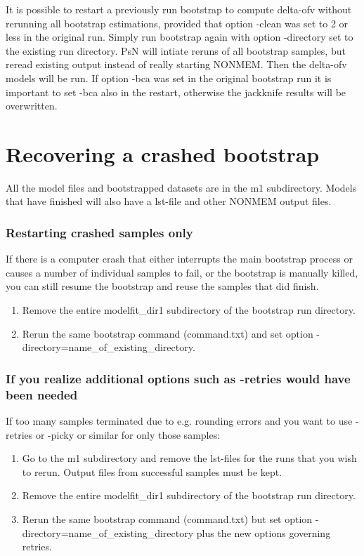 It is possible to restart a previously run bootstrap to compute delta-ofv without rerunning all bootstrap estimations, provided that option -clean was set to 2 or less in the original run. Simply run bootstrap again with option -directory set to the existing run directory. PsN will intiate reruns of all bootstrap samples, but reread existing output instead of really starting NONMEM. Then the delta-ofv models will be run. If option -bca was set in the original bootstrap run it is important to set -bca also in the restart, otherwise the jackknife results will be overwritten. 

\section{Recovering a crashed bootstrap}

All the model files and bootstrapped datasets are in the m1 subdirectory. Models that have finished will also have a 
lst-file and other NONMEM output files.  
\subsubsection*{Restarting crashed samples only}
If there is a computer crash that either interrupts the main bootstrap process or causes a number of individual samples to fail, or the bootstrap is manually killed, you can still resume the bootstrap and reuse the samples that did finish.
\begin{enumerate}
    \item Remove the entire modelfit\_dir1 subdirectory of the bootstrap run directory.
	\item Rerun the same bootstrap command (command.txt) and set option -directory=name\_of\_existing\_directory. 
\end{enumerate}

\subsubsection*{If you realize additional options such as -retries would have been needed}
If too many samples terminated due to e.g. rounding errors and you want to use -retries or -picky or similar for only those samples:
\begin{enumerate}
	\item Go to the m1 subdirectory and remove the lst-files for the runs that you wish to rerun. Output files from successful samples must be kept.
    \item Remove the entire modelfit\_dir1 subdirectory of the bootstrap run directory.
	\item Rerun the same bootstrap command 
(command.txt) but set option -directory=name\_of\_existing\_directory 
plus the new options governing retries.
\end{enumerate}

